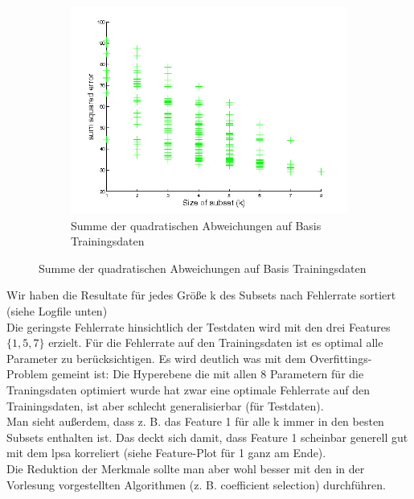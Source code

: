 \documentclass{article}
\begin{document}
	\begin{figure}[H]
	  \begin{subfigure}
	    \centering
	    \includegraphics[scale=0.7,bb=0 0 576 432]{task2-sum-sq-errors.png}
		\caption{Summe der quadratischen Abweichungen auf Basis Trainingsdaten}
	  \end{subfigure}
	\end{figure}
	
	Wir haben die Resultate für jedes Größe k des Subsets nach Fehlerrate sortiert (siehe Logfile unten)\\
	Die geringste Fehlerrate hinsichtlich der Testdaten wird mit den drei Features $ \{1, 5, 7\} $ erzielt. Für die Fehlerrate auf den Trainingsdaten ist es optimal alle Parameter zu berücksichtigen. Es wird deutlich was mit dem Overfittings-Problem gemeint ist: Die Hyperebene die mit allen 8 Parametern für die Traningsdaten optimiert wurde hat zwar eine optimale Fehlerrate auf den Trainingsdaten, ist aber schlecht generalisierbar (für Testdaten).\\
	Man sieht außerdem, dass z. B. das Feature 1 für alle k immer in den besten Subsets enthalten ist. Das deckt sich damit, dass Feature 1 scheinbar generell gut mit dem lpsa korreliert (siehe Feature-Plot für 1 ganz am Ende).\\
	Die Reduktion der Merkmale sollte man aber wohl besser mit den in der Vorlesung vorgestellten Algorithmen (z. B. coefficient selection) durchführen.\\
	
\end{document}
